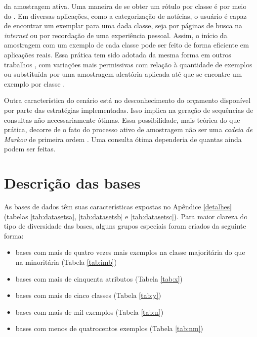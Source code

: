 da amostragem ativa.
Uma maneira de se obter um rótulo por classe é por meio do
  \citep{conf/kdd/AttenbergP10}.
 Em diversas aplicações, como a categorização de notícias, o usuário é capaz
 de encontrar um exemplar para uma dada classe, seja por páginas de busca
 na \textit{internet} ou por recordação de uma experiência pessoal.
 Assim, o início da amostragem com um exemplo de cada classe pode ser
 feito de forma eficiente em aplicações reais.
 Essa prática tem sido adotada da mesma forma em outros trabalhos
 \citep{conf/nips/GuoS07, conf/cvpr/BiswasP13, conf/iconip/GuJC14a,
 }, com variações mais permissivas com relação à quantidade de exemplos
 \citep{journals/prl/PatraB12} ou substituída por uma amostragem aleatória
 aplicada até que se encontre um exemplo por classe \citep{chermanaprendizado}.

 
Outra característica do cenário está no desconhecimento do orçamento disponível por parte das estratégias implementadas.
Isso implica na geração de sequências de consultas não necessariamente ótimas.
Essa possibilidade, mais teórica do que prática,
decorre de o fato do processo ativo de amostragem não ser uma
\textit{cadeia de Markov} de primeira ordem \citep{conf/icml/RoyM01}.
Uma consulta ótima dependeria de quantas ainda podem ser feitas.

\section{Descrição das bases}
As bases de dados têm suas características expostas no Apêndice \ref{detalhes}
(tabelas \ref{tab:datasetsa},
\ref{tab:datasetsb} e \ref{tab:datasetsc}).
Para maior clareza do tipo de diversidade das bases, alguns grupos especiais foram
criados da seguinte forma:
\begin{itemize}
 \item bases com mais de quatro vezes mais exemplos na classe
majoritária do que na minoritária (Tabela \ref{tab:imb})
 \item bases com mais de cinquenta atributos (Tabela \ref{tab:x})
 \item bases com mais de cinco classes (Tabela \ref{tab:y})
 \item bases com mais de mil exemplos (Tabela \ref{tab:n})
 \item bases com menos de quatrocentos exemplos (Tabela \ref{tab:nm})
\end{itemize}

